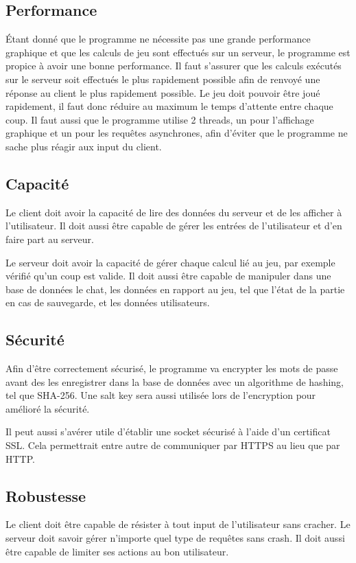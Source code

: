 \subsection{Performance}
Étant donné que le programme ne nécessite pas une grande performance graphique et que les calculs de jeu sont effectués sur un serveur, le
programme est propice à avoir une bonne performance. Il faut s'assurer que les calculs exécutés sur le serveur soit effectués le plus
rapidement possible afin de renvoyé une réponse au client le plus rapidement possible. Le jeu doit pouvoir être joué rapidement, il faut
donc réduire au maximum le temps d'attente entre chaque coup.
Il faut aussi que le programme utilise 2 threads, un pour l'affichage graphique et un pour les requêtes asynchrones, afin d'éviter que le
programme ne sache plus réagir aux input du client.

\subsection{Capacité}
Le client doit avoir la capacité de lire des données du serveur et de les afficher à l'utilisateur. Il doit aussi être capable de gérer les
entrées de l'utilisateur et d'en faire part au serveur.

Le serveur doit avoir la capacité de gérer chaque calcul lié au jeu, par exemple vérifié qu'un coup est valide. Il doit aussi être capable
de manipuler dans une base de données le chat, les données en rapport au jeu, tel que l'état de la partie en cas de sauvegarde, et les 
données utilisateurs.

\subsection{Sécurité}
Afin d'être correctement sécurisé, le programme va encrypter les mots de passe avant des les enregistrer dans la base de données avec un
algorithme de hashing, tel que SHA-256. Une salt key sera aussi utilisée lors de l'encryption pour amélioré la sécurité.

Il peut aussi s'avérer utile d'établir une socket sécurisé à l'aide d'un certificat SSL. Cela permettrait entre autre de communiquer par HTTPS au
lieu que par HTTP.

\subsection{Robustesse}
Le client doit être capable de résister à tout input de l'utilisateur sans cracher.
Le serveur doit savoir gérer n'importe quel type de requêtes sans crash. Il doit aussi être capable de limiter ses actions au bon utilisateur.

